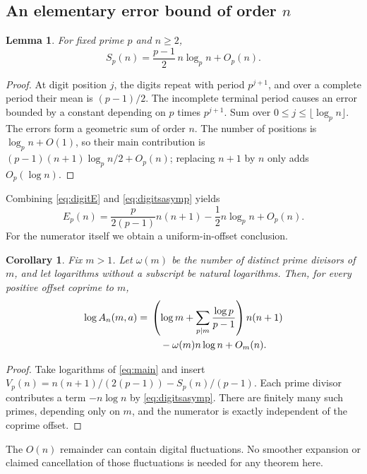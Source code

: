 \documentclass[11pt,a4paper]{article}
\numberwithin{equation}{section}
\newtheorem{lemma}[theorem]{Lemma}
\newtheorem{corollary}[theorem]{Corollary}
\theoremstyle{definition}
\theoremstyle{remark}
\begin{document}
\subsection{An elementary error bound of order $n$}
\begin{lemma}\label{lem:digitsasymp}
For fixed prime $p$ and $n\geq2$,
\begin{equation}\label{eq:digitsasymp}
 S_p(n)=\frac{p-1}{2}\,n\log_p n+O_p(n).
\end{equation}
\end{lemma}
\begin{proof}
At digit position $j$, the digits repeat with period $p^{j+1}$, and over a complete period their mean is $(p-1)/2$. The incomplete terminal period causes an error bounded by a constant depending on $p$ times $p^{j+1}$. Sum over $0\leq j\leq\lfloor\log_p n\rfloor$. The errors form a geometric sum of order $n$. The number of positions is $\log_p n+O(1)$, so their main contribution is $(p-1)(n+1)\log_p n/2+O_p(n)$; replacing $n+1$ by $n$ only adds $O_p(\log n)$.
\end{proof}

Combining \eqref{eq:digitE} and \eqref{eq:digitsasymp} yields
\begin{equation}\label{eq:Easymp}
 E_p(n)=\frac{p}{2(p-1)}n(n+1)-\frac12 n\log_p n+O_p(n).
\end{equation}
For the numerator itself we obtain a uniform-in-offset conclusion.

\begin{corollary}\label{cor:Aasymp}
Fix $m>1$. Let $\omega(m)$ be the number of distinct prime divisors of $m$, and let logarithms without a subscript be natural logarithms. Then, for every positive offset coprime to $m$,
\begin{align}
 \log A_n(m,a)
 ={}&\left(\log m+\sum_{p\mid m}\frac{\log p}{p-1}\right)n(n+1)\notag\\
 &\quad-\omega(m)n\log n+O_m(n).
 \label{eq:Aasymp}
\end{align}
\end{corollary}
\begin{proof}
Take logarithms of \eqref{eq:main} and insert
$V_p(n)=n(n+1)/(2(p-1))-S_p(n)/(p-1)$. Each prime divisor contributes a term $-n\log n$ by \eqref{eq:digitsasymp}. There are finitely many such primes, depending only on $m$, and the numerator is exactly independent of the coprime offset.
\end{proof}

The $O(n)$ remainder can contain digital fluctuations. No smoother expansion or claimed cancellation of those fluctuations is needed for any theorem here.
\end{document}
